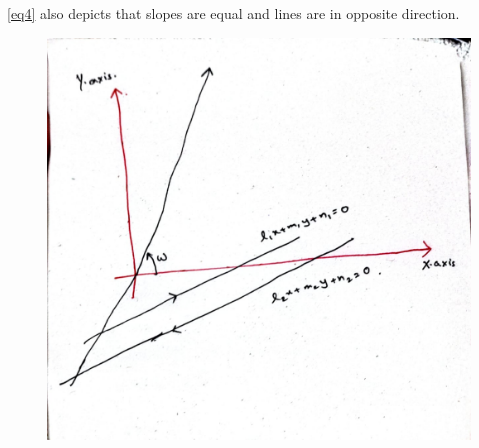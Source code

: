 \documentclass[journal,12pt,twocolumn]{IEEEtran}
\begin{document}
\eqref{eq4} also depicts that slopes are equal and lines are in opposite direction.
\begin{figure}[!ht]
	\centering
	\includegraphics[width=\columnwidth]{assignment_2.jpeg}
	\caption{}
	\label{fig:assignment02}
\end{figure}
\end{document}
